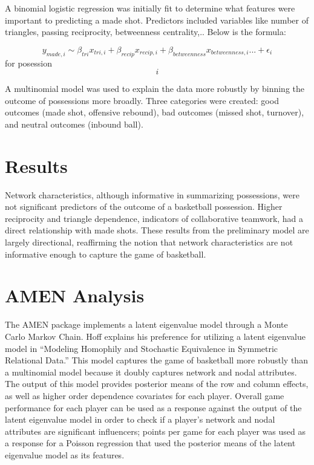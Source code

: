 \documentclass[12pt,twoside]{dukestatscithesis}
\theoremstyle{definition}
\theoremstyle{definition}
\theoremstyle{definition}
\theoremstyle{remark}
\begin{document}
A binomial logistic regression was initially fit to determine what
features were important to predicting a made shot. Predictors included
variables like number of triangles, passing reciprocity, betweenness
centrality,.. Below is the formula:

\[y_{made,i} \sim \beta_{tri}x_{tri,i} + \beta_{recip}x_{recip,i} + \beta_{betweenness}x_{betweenness,i}... + \epsilon_{i}\]
for posession \[i\]

A multinomial model was used to explain the data more robustly by
binning the outcome of possessions more broadly. Three categories were
created: good outcomes (made shot, offensive rebound), bad outcomes
(missed shot, turnover), and neutral outcomes (inbound ball).

\section{Results}\label{results}

Network characteristics, although informative in summarizing
possessions, were not significant predictors of the outcome of a
basketball possession. Higher reciprocity and triangle dependence,
indicators of collaborative teamwork, had a direct relationship with
made shots. These results from the preliminary model are largely
directional, reaffirming the notion that network characteristics are not
informative enough to capture the game of basketball.

\section{AMEN Analysis}\label{amen-analysis}

The AMEN package implements a latent eigenvalue model through a Monte
Carlo Markov Chain. Hoff explains his preference for utilizing a latent
eigenvalue model in ``Modeling Homophily and Stochastic Equivalence in
Symmetric Relational Data.'' This model captures the game of basketball
more robustly than a multinomial model because it doubly captures
network and nodal attributes. The output of this model provides
posterior means of the row and column effects, as well as higher order
dependence covariates for each player. Overall game performance for each
player can be used as a response against the output of the latent
eigenvalue model in order to check if a player's network and nodal
attributes are significant influencers; points per game for each player
was used as a response for a Poisson regression that used the posterior
means of the latent eigenvalue model as its features.
\end{document}
